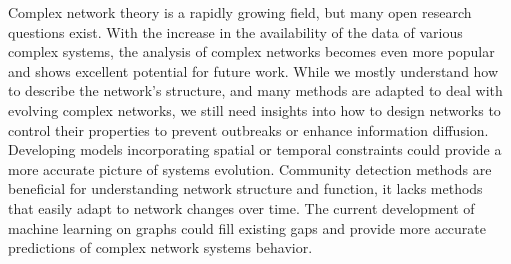 


Complex network theory is a rapidly growing field, but many open research questions exist. With the increase in the availability of the data of various complex systems, the analysis of complex networks becomes even more popular and shows excellent potential for future work. While we mostly understand how to describe the network's structure, and many methods are adapted to deal with evolving complex networks, we still need insights into how to design networks to control their properties to prevent outbreaks or enhance information diffusion. Developing models incorporating spatial or temporal constraints could provide a more accurate picture of systems evolution. Community detection methods are beneficial for understanding network structure and function, it lacks methods that easily adapt to network changes over time. The current development of machine learning on graphs could fill existing gaps and provide more accurate predictions of complex network systems behavior.

\sffamily
{}\selectfont


	

